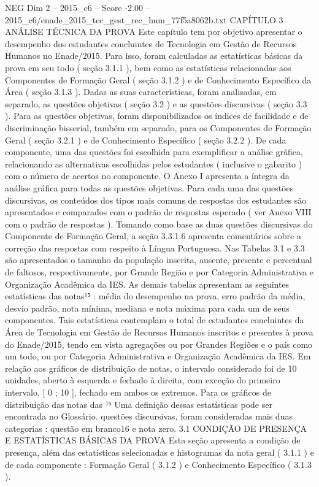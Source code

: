 \begin{textsample}{NEG Dim 2 – 2015\_c6 – Score -2.00 – 2015\_c6/enade\_2015\_tec\_gest\_rec\_hum\_77f5a8062b.txt}  \label{ex:f2_neg_193}
CAPÍTULO 3 ANÁLISE TÉCNICA DA PROVA Este capítulo tem por objetivo apresentar o desempenho dos estudantes concluintes de Tecnologia em Gestão de Recursos Humanos no Enade/2015.
Para isso, foram calculadas as estatísticas básicas da prova em seu todo ( seção 3.1.1 ), bem como as estatísticas relacionadas aos Componentes de Formação Geral ( seção 3.1.2 ) e de Conhecimento Específico da Área ( seção 3.1.3 ).
Dadas as suas características, foram analisadas, em separado, as questões objetivas ( seção 3.2 ) e as questões discursivas ( seção 3.3 ).
Para as questões objetivas, foram disponibilizados os índices de facilidade e de discriminação bisserial, também em separado, para os Componentes de Formação Geral ( seção 3.2.1 ) e de Conhecimento Específico ( seção 3.2.2 ).
De cada componente, uma das questões foi escolhida para exemplificar a análise gráfica, relacionando as alternativas escolhidas pelos estudantes ( inclusive o gabarito ) com o número de acertos no componente.
O Anexo I apresenta a íntegra da análise gráfica para todas as questões objetivas.
Para cada uma das questões discursivas, os conteúdos dos tipos mais comuns de respostas dos estudantes são apresentados e comparados com o padrão de respostas esperado ( ver Anexo VIII com o padrão de respostas ).
Tomando como base as duas questões discursivas do Componente de Formação Geral, a seção 3.3.1.6 apresenta comentários sobre a correção das respostas com respeito à Língua Portuguesa.
Nas Tabelas 3.1 e 3.3 são apresentados o tamanho da população inscrita, ausente, presente e percentual de faltosos, respectivamente, por Grande Região e por Categoria Administrativa e Organização Acadêmica da IES.
As demais tabelas apresentam as seguintes estatísticas das notas¹⁵ : média do desempenho na prova, erro padrão da média, desvio padrão, nota mínima, mediana e nota máxima para cada um de seus componentes.
Tais estatísticas contemplam o total de estudantes concluintes da Área de Tecnologia em Gestão de Recursos Humanos inscritos e presentes à prova do Enade/2015, tendo em vista agregações ou por Grandes Regiões e o país como um todo, ou por Categoria Administrativa e Organização Acadêmica da IES.
Em relação aos gráficos de distribuição de notas, o intervalo considerado foi de 10 unidades, aberto à esquerda e fechado à direita, com exceção do primeiro intervalo, [ 0 ; 10 ], fechado em ambos os extremos.
Para os gráficos de distribuição das notas das ¹⁵ Uma definição dessas estatísticas pode ser encontrada no Glossário. questões discursivas, foram consideradas mais duas categorias : questão em branco16 e nota zero. 3.1 CONDIÇÃO DE PRESENÇA E ESTATÍSTICAS BÁSICAS DA PROVA Esta seção apresenta a condição de presença, além das estatísticas selecionadas e histogramas da nota geral ( 3.1.1 ) e de cada componente : Formação Geral ( 3.1.2 ) e Conhecimento Específico ( 3.1.3 ).

\end{textsample}

